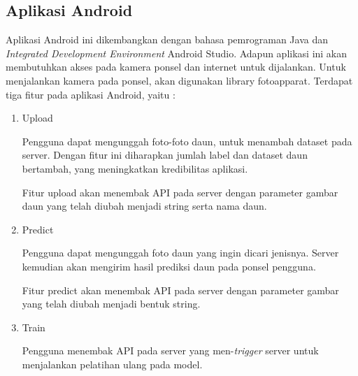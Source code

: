 \subsection{Aplikasi Android}
\par Aplikasi Android ini dikembangkan dengan bahasa pemrograman Java dan \textit{Integrated Development Environment} Android Studio. Adapun aplikasi ini akan membutuhkan akses pada kamera ponsel dan internet untuk dijalankan. Untuk menjalankan kamera pada ponsel, akan digunakan library fotoapparat. Terdapat tiga fitur pada aplikasi Android, yaitu :
\begin {enumerate}
\item Upload
\par Pengguna dapat mengunggah foto-foto daun, untuk menambah dataset pada server. Dengan fitur ini diharapkan jumlah label dan dataset daun bertambah, yang meningkatkan kredibilitas aplikasi. 
\par Fitur upload akan menembak API pada server dengan parameter gambar daun yang telah diubah menjadi string serta nama daun.
\item Predict
\par Pengguna dapat mengunggah foto daun yang ingin dicari jenisnya. Server kemudian akan mengirim hasil prediksi daun pada ponsel pengguna.
\par Fitur predict akan menembak API pada server dengan parameter gambar yang telah diubah menjadi bentuk string.
\item Train
\par Pengguna menembak API pada server yang men-\textit{trigger} server untuk menjalankan pelatihan ulang pada model.
\end {enumerate}\begin{flushleft}
	
\end{flushleft}
